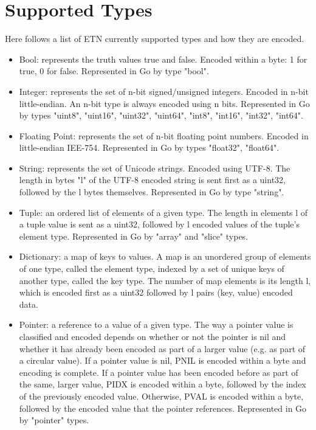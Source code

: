 \section{Supported Types}

Here follows a list of ETN currently supported types and how they are encoded.

\begin{itemize}

	\item Bool: represents the truth values true and false. Encoded within a byte: 1 for true, 0 for false. Represented in Go by type "bool".
	
	\item Integer: represents the set of n-bit signed/unsigned integers. Encoded in n-bit little-endian. An n-bit type is always encoded using n bits. Represented in Go by types "uint8", "uint16", "uint32", "uint64", "int8", "int16", "int32", "int64".
	
	\item Floating Point: represents the set of n-bit floating point numbers. Encoded in little-endian IEE-754. Represented in Go by types "float32", "float64".
	
	\item String: represents the set of Unicode strings. Encoded using UTF-8. The length in bytes "l" of the UTF-8 encoded string is sent first as a uint32, followed by the l bytes themselves. Represented in Go by type "string".
	
	\item Tuple: an ordered list of elements of a given type. The length in elements l of a tuple value is sent as a uint32, followed by l encoded values of the tuple's element type. Represented in Go by "array" and "slice" types.
	
	\item Dictionary: a map of keys to values. A map is an unordered group of elements of one type, called the element type, indexed by a set of unique keys of another type, called the key type. The number of map elements is its length l, which is encoded first as a uint32 followed by l pairs (key, value) encoded data.
	
	\item Pointer: a reference to a value of a given type. The way a pointer value is classified and encoded depends on whether or not the pointer is nil and whether it has already been encoded as part of a larger value (e.g. as part of a circular value).
	If a pointer value is nil, PNIL is encoded within a byte and encoding is complete.
	If a pointer value has been encoded before as part of the same, larger value, PIDX is encoded within a byte, followed by the index of the
previously encoded value.
Otherwise, PVAL is encoded within a byte, followed by the encoded value that the pointer references.
Represented in Go by "pointer" types.


\end{itemize}
